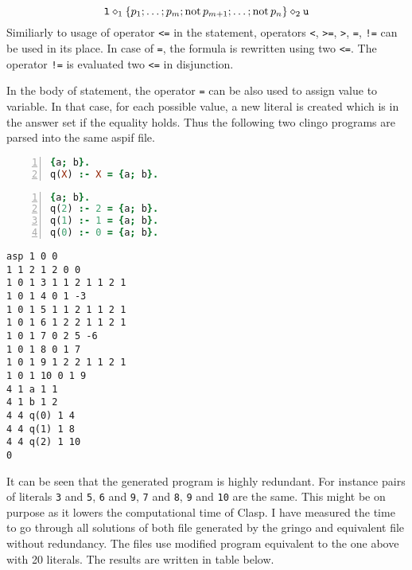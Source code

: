\documentclass{fithesis}
\begin{document}
\begin{equation*}
    \texttt{l} \diamond_1 \{p_1; \dots; p_m; \mathrm{not}\, p_{m+1}; \dots; \mathrm{not}\, p_n\} \diamond_2 \texttt{u}
\end{equation*}
Similiarly to usage of operator \texttt{<=} in the statement, operators
\texttt{<}, \texttt{>=}, \texttt{>}, \texttt{=}, \texttt{!=} can be used in its
place. In case of \texttt{=}, the formula is rewritten using two \texttt{<=}.
The operator \texttt{!=} is evaluated two \texttt{<=} in disjunction.

In the body of statement, the operator \texttt{=} can be also used to assign
value to variable. In that case, for each possible value, a new literal is
created which is in the answer set if the equality holds. Thus the following
two clingo programs are parsed into the same aspif file.

\begin{minipage}[t]{0.45\linewidth}
\centering
\begin{lstlisting}[language=prolog, numbers=left, countblanklines=false]
{a; b}.
q(X) :- X = {a; b}.
\end{lstlisting}
\begin{lstlisting}[language=prolog, numbers=left, countblanklines=false]
{a; b}.
q(2) :- 2 = {a; b}.
q(1) :- 1 = {a; b}.
q(0) :- 0 = {a; b}.
\end{lstlisting}
\end{minipage}
\hspace{1em}
\begin{minipage}[t]{0.45\linewidth}
\centering
\begin{lstlisting}[numbers=right, countblanklines=false]
asp 1 0 0
1 1 2 1 2 0 0
1 0 1 3 1 1 2 1 1 2 1
1 0 1 4 0 1 -3
1 0 1 5 1 1 2 1 1 2 1
1 0 1 6 1 2 2 1 1 2 1
1 0 1 7 0 2 5 -6
1 0 1 8 0 1 7
1 0 1 9 1 2 2 1 1 2 1
1 0 1 10 0 1 9
4 1 a 1 1
4 1 b 1 2
4 4 q(0) 1 4
4 4 q(1) 1 8
4 4 q(2) 1 10
0
\end{lstlisting}
\end{minipage}

It can be seen that the generated program is highly redundant. For instance
pairs of literals \texttt{3} and \texttt{5}, \texttt{6} and \texttt{9},
\texttt{7} and \texttt{8}, \texttt{9} and \texttt{10} are the same.
This might be on purpose as it lowers the computational time of Clasp.
I have measured the time to go through all solutions of both file generated by
the gringo and equivalent file without redundancy. The files use modified
program equivalent to the one above with 20 literals.
The results are written in table below.
\end{document}
